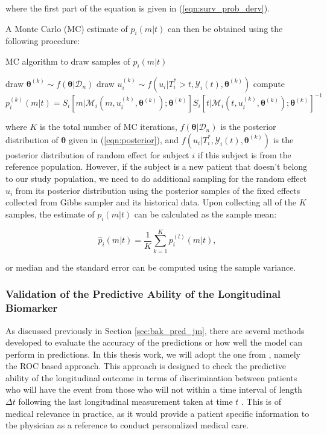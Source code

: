 where the first part of the equation is given in (\ref{eqn:surv_prob_derv}).\par

A Monte Carlo (MC) estimate of $p_i(m|t)$ can then be obtained using the following procedure:

\begin{algorithm}[H]
\caption{MC algorithm to draw samples of $p_i(m|t)$}\label{draw_pi}
\begin{algorithmic}
\State draw $\boldsymbol{\theta}^{(k)}\sim f(\boldsymbol{\theta}|\mathcal{D}_n)$
\State draw $u^{(k)}_i\sim f(u_i|T_i^*>t, \mathcal{Y}_i(t), \boldsymbol{\theta}^{(k)})$
\State compute $p_i^{(k)}(m|t)=S_i[m|\mathcal{M}_i(m, u^{(k)}_i, \boldsymbol{\theta}^{(k)});\boldsymbol{\theta}^{(k)}]S_i[t|\mathcal{M}_i(t, u^{(k)}_i, \boldsymbol{\theta}^{(k)});\boldsymbol{\theta}^{(k)}]^{-1}$
\EndFor
\end{algorithmic}
\end{algorithm}

where $K$ is the total number of MC iterations, $f(\boldsymbol{\theta}|\mathcal{D}_n)$ is the posterior distribution of 
$\boldsymbol{\theta}$ given in (\ref{eqn:posterior}), and $f(u_i|T_i^*, \mathcal{Y}_i(t), \boldsymbol{\theta}^{(k)})$ is the posterior distribution of random effect for subject $i$ if this subject is from the reference population. However, if the subject is a new patient that doesn't belong to our study population, we need to do additional sampling for the random effect $u_i$ from its posterior distribution using the posterior samples of the fixed effects collected from Gibbs sampler and its historical data. Upon collecting all of the $K$ samples, the estimate of $p_i(m|t)$ can be calculated as the sample mean:

\begin{equation}\label{eqn:sample_mean}
\hat{p}_i(m|t)=\frac{1}{K}\sum_{k=1}^K p^{(l)}_i(m|t),
\end{equation}

or median and the standard error can be computed using the sample variance.


\subsubsection{Validation of the Predictive Ability of the Longitudinal Biomarker}
As discussed previously in Section \ref{sec:bak_pred_jm}, there are several methods developed to evaluate the accuracy of the predictions or how well the model can perform in predictions. In this thesis work, we will adopt the one from \cite{rizopoulos2011dynamic}, namely the ROC based approach. This approach is designed to check the predictive ability of the longitudinal outcome in terms of discrimination between patients who will have the event from those who will not within a time interval of length $\Delta t$ following the last longitudinal measurement taken at time $t$ \citep{pencina2008evaluating}. This is of medical relevance in practice, as it would provide a patient specific information to the physician as a reference to conduct personalized medical care.\par

